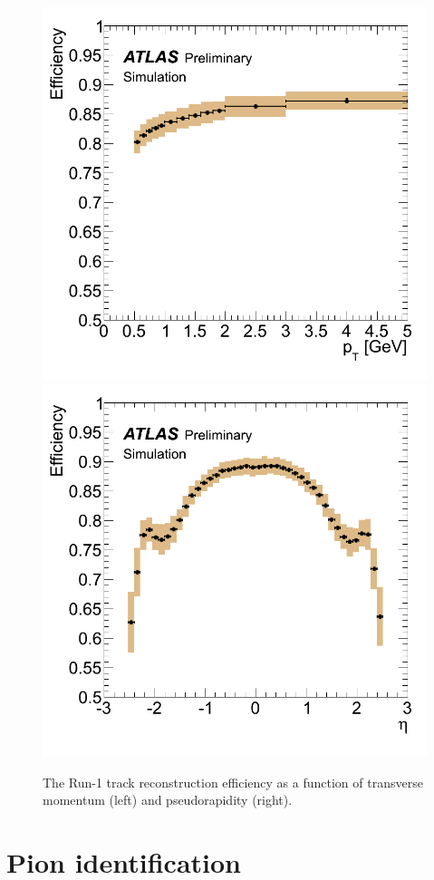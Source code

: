 \begin{figure}[t]
  \includegraphics[width=0.49\linewidth]{atl_com_phys_2012_1541_fig_07_eff_pt.png}
  \includegraphics[width=0.49\linewidth]{atl_com_phys_2012_1541_fig_08_eff_eta.png}
  \caption{The Run-1 track reconstruction efficiency as a function of transverse momentum (left) and pseudorapidity (right).}
  \label{fig:trk_eff}
\end{figure}

\section{Pion identification}


